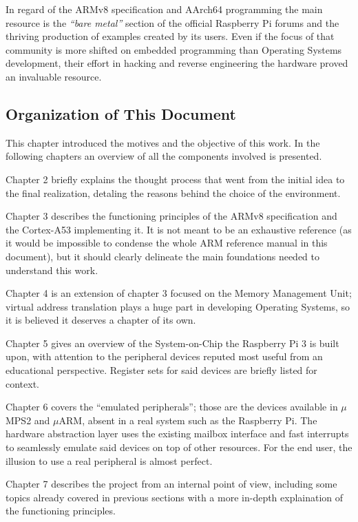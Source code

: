 \documentclass[12pt,a4paper,openright,twoside]{report}
\begin{document}
In regard of the ARMv8 specification and AArch64 programming the main resource
is the \textit{``bare metal''} section of the official Raspberry Pi forums and the thriving
production of examples created by its users. Even if the focus of that community
is more shifted on embedded programming than Operating Systems development, their
effort in hacking and reverse engineering the hardware proved an invaluable resource.

\subsection{Organization of This Document}
This chapter introduced the motives and the objective of this work. In the following
chapters an overview of all the components involved is presented.

Chapter 2 briefly explains the thought process that went from the initial idea
to the final realization, detaling the reasons behind the choice of the environment.

Chapter 3 describes the functioning principles of the ARMv8 specification and
 the Cortex-A53 implementing it. It is not meant to be an exhaustive reference 
 (as it would be impossible to condense the whole ARM reference manual in this
 document), but it should clearly delineate the main foundations needed to 
 understand this work.

Chapter 4 is an extension of chapter 3 focused on the Memory Management Unit; 
virtual address translation plays a huge part in developing
Operating Systems, so it is believed it deserves a chapter of its own.

Chapter 5 gives an overview of the System-on-Chip the Raspberry Pi 3 is built
upon, with attention to the peripheral devices reputed most useful from an 
educational perspective. Register sets for said devices are briefly listed for 
context.

Chapter 6 covers the ``emulated peripherals''; those are the devices available in 
$\mu$MPS2 and $\mu$ARM, absent in a real system such as the Raspberry Pi. The hardware
abstraction layer uses the existing mailbox interface and fast interrupts
 to seamlessly emulate said
devices on top of other resources. For the end user, the illusion to use a real
peripheral is almost perfect.

Chapter 7 describes the project from an internal point of view, including some
topics already covered in previous sections with a more in-depth explaination
of the functioning principles.
\end{document}
